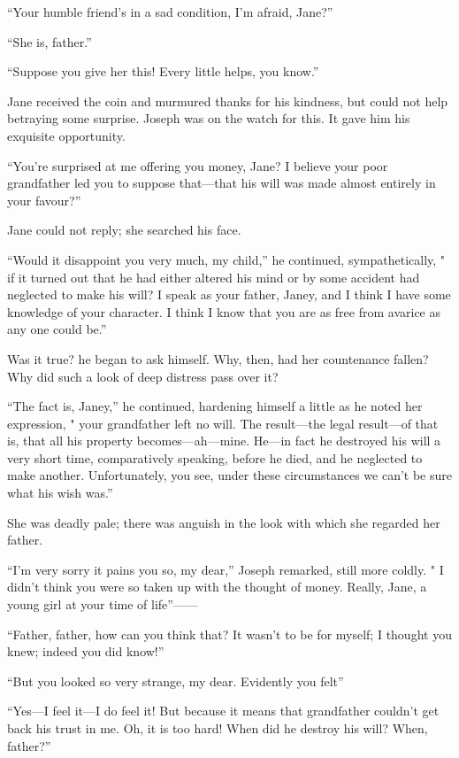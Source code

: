``Your humble friend's in a sad condition, I'm afraid, Jane?''

``She is, father.''

``Suppose you give her this! Every little helps, you know.''

Jane received the coin and murmured thanks for his kindness, but could
not help betraying some surprise. Joseph was on the watch for this. It
gave him his exquisite opportunity.

``You're surprised at me offering you money, Jane? I believe your poor
grandfather led you to suppose that---that his will was made almost
entirely in your favour?''

Jane could not reply; she searched his face.

``Would it disappoint you very much, my child,'' he continued,
sympathetically, " if it turned out that he had either altered his mind
{\protect\hypertarget{229}{}{}}or by some accident had neglected to make
his will? I speak as your father, Janey, and I think I have some
knowledge of your character. I think I know that you are as free from
avarice as any one could be.''

Was it true? he began to ask himself. Why, then, had her countenance
fallen? Why did such a look of deep distress pass over it?

``The fact is, Janey,'' he continued, hardening himself a little as he
noted her expression, " your grandfather left no will. The result---the
legal result---of that is, that all his property becomes---ah---mine.
He---in fact he destroyed his will a very short time, comparatively
speaking, before he died, and he neglected to make another.
Unfortunately, you see, under these circumstances we can't be sure what
his wish was.''

She was deadly pale; there was anguish in the look with which she
regarded her father.

``I'm very sorry it pains you so, my dear,'' Joseph remarked, still more
coldly. " I didn't think you were so taken up with the thought of money.
Really, Jane, a young girl at your time of life''{{------}}

``Father, father, how can you think that?
{\protect\hypertarget{230}{}{}}It wasn't to be for myself; I thought you
knew; indeed you did know!''

``But you looked so very strange, my dear. Evidently you felt''

``Yes---I feel it---I do feel it! But because it means that grandfather
couldn't get back his trust in me. Oh, it is too hard! When did he
destroy his will? When, father?''

